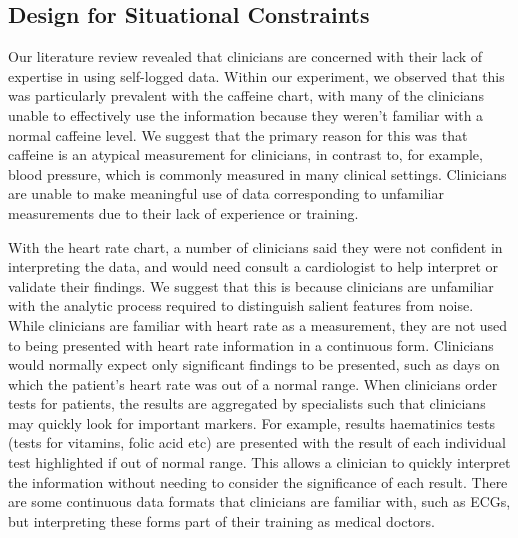 \documentclass{sigchi}
\begin{document}


\subsection{Design for Situational Constraints} %



Our literature review revealed that clinicians are concerned with their lack of expertise in using self-logged data. Within our experiment, we observed that this was particularly prevalent with the caffeine chart, with many of the clinicians unable to effectively use the information because they weren't familiar with a normal caffeine level. We suggest that the primary reason for this was that caffeine is an atypical measurement for clinicians, in contrast to, for example, blood pressure, which is commonly measured in many clinical settings. Clinicians are unable to make meaningful use of data corresponding to unfamiliar measurements due to their lack of experience or training.


With the heart rate chart, a number of clinicians said they were not confident in interpreting the data, and would need consult a cardiologist to help interpret or validate their findings. We suggest that this is because clinicians are unfamiliar with the analytic process required to distinguish salient features from noise. While clinicians are familiar with heart rate as a measurement, they are not used to being presented with heart rate information in a continuous form. Clinicians would normally expect only significant findings to be presented, such as days on which the patient's heart rate was out of a normal range.  When clinicians order tests for patients, the results are aggregated by specialists such that clinicians may quickly look for important markers. For example, results haematinics tests (tests for vitamins, folic acid etc) are presented with the result of each individual test highlighted if out of normal range. This allows a clinician to quickly interpret the information without needing to consider the significance of each result. There are some continuous data formats that clinicians are familiar with, such as ECGs, but interpreting these forms part of their training as medical doctors.
\end{document}

